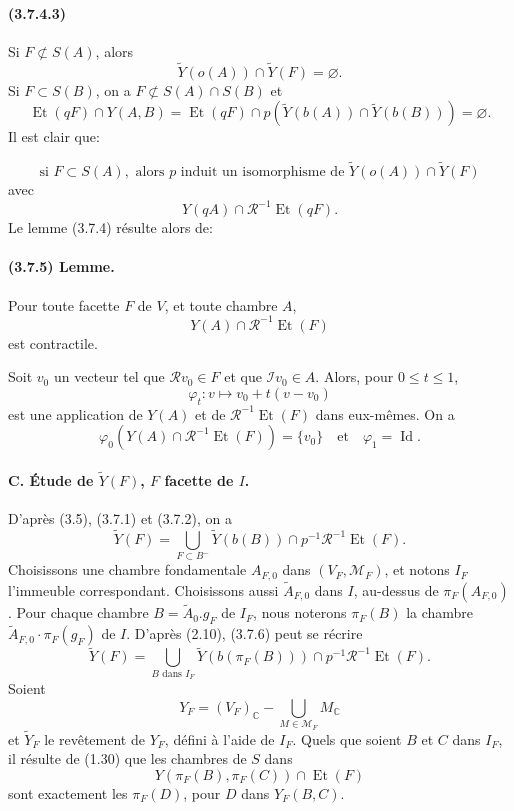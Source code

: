 \documentclass[10pt]{article}
\newcommand{\C}{\mathbb C}
\begin{document}
\paragraph{(3.7.4.3)} Si \(F\not\subset S(A)\), alors
\[
\widetilde Y(o(A))\cap\widetilde Y(F)=\varnothing.
\]
Si \(F\subset S(B)\), on a \(F\not\subset S(A)\cap S(B)\) et
\[
\operatorname{Et}(qF)\cap Y(A,B)
=\operatorname{Et}(qF)\cap p(\widetilde Y(b(A))\cap\widetilde Y(b(B)))=\varnothing.
\]
Il est clair que:

\[
\tag{3.7.4.4}
\text{si }F\subset S(A),\text{ alors }p\text{ induit un isomorphisme de }
\widetilde Y(o(A))\cap\widetilde Y(F)
\]
avec
\[
Y(qA)\cap\mathcal R^{-1}\operatorname{Et}(qF).
\]
Le lemme (3.7.4) résulte alors de:

\paragraph{(3.7.5) Lemme.} Pour toute facette \(F\) de \(V\), et toute chambre \(A\),
\[
Y(A)\cap\mathcal R^{-1}\operatorname{Et}(F)
\]
est contractile.

Soit \(v_0\) un vecteur tel que \(\mathcal Rv_0\in F\) et que \(\mathcal Iv_0\in A\). Alors, pour \(0\le t\le1\),
\[
\varphi_t:v\longmapsto v_0+t(v-v_0)
\]
est une application de \(Y(A)\) et de \(\mathcal R^{-1}\operatorname{Et}(F)\) dans eux-mêmes. On a
\[
\varphi_0(Y(A)\cap\mathcal R^{-1}\operatorname{Et}(F))=\{v_0\}
\quad\text{et}\quad
\varphi_1=\operatorname{Id}.
\]

\paragraph{C. Étude de \(\widetilde Y(F)\), \(F\) facette de \(I\).} D'après (3.5), (3.7.1) et (3.7.2), on a
\[
\tag{3.7.6}
\widetilde Y(F)=
\bigcup_{F\subset B^-}
\widetilde Y(b(B))\cap p^{-1}\mathcal R^{-1}\operatorname{Et}(F).
\]
Choisissons une chambre fondamentale \(A_{F,0}\) dans \((V_F,\mathcal M_F)\), et notons \(I_F\) l'immeuble correspondant. Choisissons aussi \(\widetilde A_{F,0}\) dans \(I\), au-dessus de \(\pi_F(A_{F,0})\). Pour chaque chambre \(B=\widetilde A_0.g_F\) de \(I_F\), nous noterons \(\pi_F(B)\) la chambre \(\widetilde A_{F,0}\cdot\pi_F(g_F)\) de \(I\). D'après (2.10), (3.7.6) peut se récrire
\[
\widetilde Y(F)=
\bigcup_{B\text{ dans }I_F}
\widetilde Y(b(\pi_F(B)))\cap p^{-1}\mathcal R^{-1}\operatorname{Et}(F).
\]
Soient
\[
Y_F=(V_F)_\C-\bigcup_{M\in\mathcal M_F}M_\C
\]
et \(\widetilde Y_F\) le revêtement de \(Y_F\), défini à l'aide de \(I_F\). Quels que soient \(B\) et \(C\) dans \(I_F\), il résulte de (1.30) que les chambres de \(S\) dans
\[
Y(\pi_F(B),\pi_F(C))\cap\operatorname{Et}(F)
\]
sont exactement les \(\pi_F(D)\), pour \(D\) dans \(Y_F(B,C)\).
\end{document}
